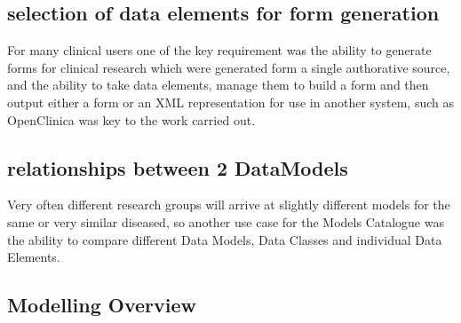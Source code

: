 \subsection{selection of data elements for form generation}
For many clinical users one of the key requirement was the ability to generate forms for clinical research which were generated form a single authorative source, and the ability to take data elements, manage them to build a form and then output either a form or an XML representation for use in another system, such as OpenClinica was key to the work carried out. 



\subsection{relationships between 2 DataModels}
Very often different research groups will arrive at slightly different models for the same or very similar diseased, so another use case for the Models Catalogue was the ability to compare different Data Models, Data Classes and individual Data Elements.






\subsection{Modelling Overview}





 
 